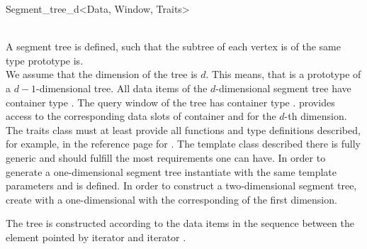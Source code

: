 \begin{ccRefClass} {Segment_tree_d<Data, Window, Traits>}

\ccTypes
{}

\ccCreation
{}
\\
%
{A segment tree is defined, such that the subtree of  each
  vertex is of the   same type prototype
 is.\\
We assume that the dimension of the tree is $d$. This means, that
 is a  prototype of a $d-1$-dimensional
tree. All data items of the $d$-dimensional segment tree
  have container type . The query window of the
  tree has container type
  . 
 provides access to the corresponding data slots of container
  and   for the $d$-th
 dimension. The traits  class 
 must at least provide all functions and type definitions
 described, for example, in the reference page for
 .
The template class
 described there is fully generic and should fulfill the most
 requirements one can have.
In order
  to generate a one-dimensional segment tree instantiate %
  with the same template parameters  and
    is defined. In
  order to construct a two-dimensional segment tree, create
   with
   a one-dimensional  with the
  corresponding  of the first dimension.\\
  }

\ccOperations

{The tree is constructed according to the data items in the
  sequence between the element pointed by iterator  and
  iterator .}




\end{ccRefClass}
